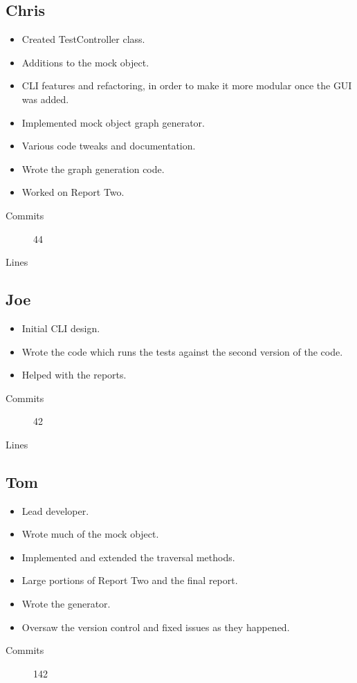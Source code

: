   \subsection{Chris}
    \begin{itemize}
     \item Created TestController class.
     \item Additions to the mock object.
     \item CLI features and refactoring, in order to make it more modular once the GUI was added.
     \item Implemented mock object graph generator.
     \item Various code tweaks and documentation.
     \item Wrote the graph generation code.
     \item Worked on Report Two.
    \end{itemize}
    \begin{description}
      \item[Commits] 44
      \item[Lines]
    \end{description}

  \subsection{Joe}
    \begin{itemize}
      \item Initial CLI design.
      \item Wrote the code which runs the tests against the second version of the code.
      \item Helped with the reports.
    \end{itemize}
    \begin{description}
      \item[Commits] 42
      \item[Lines]
    \end{description}

  \subsection{Tom}
    \begin{itemize}
      \item Lead developer.
      \item Wrote much of the mock object.
      \item Implemented and extended the traversal methods.
      \item Large portions of Report Two and the final report.
      \item Wrote the generator.
      \item Oversaw the version control and fixed issues as they happened.
    \end{itemize}
    \begin{description}
      \item[Commits] 142
    \end{description}
